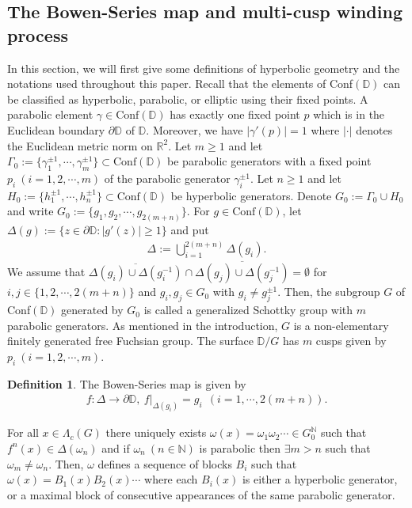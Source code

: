 \documentclass{article}
\theoremstyle{definition}
\newtheorem{definition}[thm]{Definition}
\begin{document}
\subsection{The Bowen-Series map and multi-cusp winding process}
In this section, we will first give some definitions of hyperbolic geometry and the notations used throughout this paper. 
Recall that the elements of Conf$(\mathbb{D})$ can be  classified as hyperbolic, parabolic, or elliptic using their fixed points.   A parabolic element $\gamma\in\text{Conf}(\mathbb{D})$ has exactly one fixed point $p$ which is in the Euclidean boundary $\partial \mathbb{D}$ of $\mathbb{D}$. Moreover, we have $|\gamma'(p)|=1$ where $|\cdot|$ denotes the Euclidean metric norm on $\mathbb{R}^2$.
Let $m\geq 1$ and let
$\Gamma_0:=\lbrace \gamma_1^{\pm 1},\cdots,\gamma_m^{\pm 1}\rbrace \subset \text{Conf}(\mathbb{D})$
be parabolic generators with a fixed point $p_i\ (i=1,2,\cdots,m)$ of the parabolic generator $\gamma_i^{\pm1}$. Let $n\geq1$ and let
$H_0:=\lbrace h_1^{\pm 1},\cdots,h_{n}^{\pm 1} \rbrace \subset \text{Conf}(\mathbb{D})$
be hyperbolic generators. Denote $G_0:=\Gamma_0 \cup H_0$ and write $G_0:=\lbrace g_1,g_2,\cdots,g_{2(m+n)} \rbrace$.  For $g \in \text{Conf}(\mathbb{D})$, let $\Delta(g):=\lbrace z \in \partial \mathbb{D} : |g'(z)|\geq1 \rbrace$ and put
\begin{align}
    \Delta:=\bigcup_{i=1}^{2(m+n)}\Delta({g_i}).\nonumber
\end{align}
We assume that 
    $\overline{\Delta({g_i})\cup \Delta({g_i^{-1}})}\cap \overline{{\Delta({g_j})\cup \Delta({g_j^{-1}})}}= \emptyset$
for $i,j\in\{1,2,\cdots,2(m+n)\}$ and $g_i,g_j\in G_0$ with $ g_i \neq g_j^{\pm 1}$. Then, the subgroup $G$ of Conf$(\mathbb{D})$ generated by $G_0$ is called a generalized Schottky group with $m$ parabolic generators. As mentioned in the introduction, $G$ is a non-elementary finitely generated free Fuchsian group. The surface $\mathbb{D} / G$ has $m$ cusps given by $p_i \ (i=1,2,\cdots,m)$.
\begin{definition}
    The Bowen-Series map \cite{bowen1979markov} is given by 
\begin{align}
   f:\Delta \rightarrow \partial \mathbb{D}, \ f|_{\Delta({g_i})}=g_i\ \ (i=1,\cdots,2(m+n)).\nonumber
\end{align}
\end{definition}
  For all $x\in \Lambda_c(G)$ there uniquely exists  $\omega(x)=\omega_1\omega_2\cdots \in G_0^\mathbb{N}$ such that $f^n(x)\in\Delta(\omega_n)$ and if $\omega_n\ (n\in \mathbb{N})$ is parabolic then $\exists m>n$ such that $\omega_m\neq\omega_n$. Then, $\omega$ defines a sequence of blocks $B_i$ such that
$\omega(x)=B_1(x)B_2(x)\cdots$
 where each $B_i(x)$ is either a hyperbolic generator, or a maximal block of consecutive appearances of the same parabolic generator.
\end{document}
